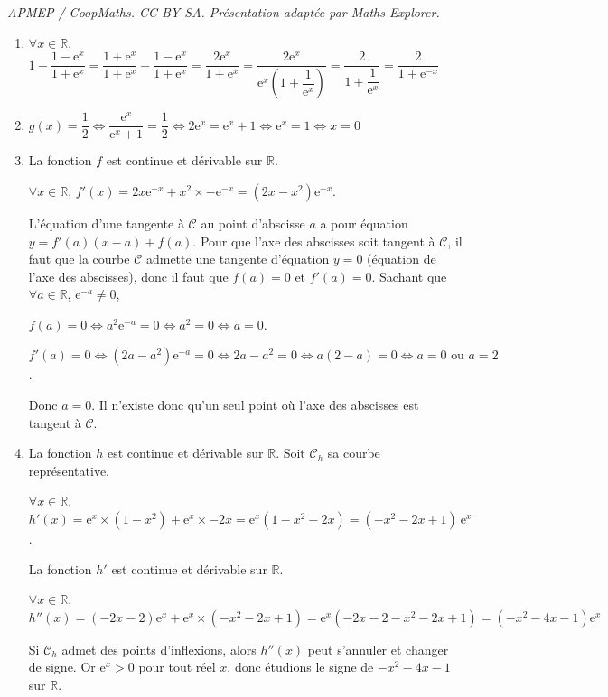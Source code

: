 \documentclass[10pt]{article}
\providecommand{\R}{\mathbb{R}}
\providecommand{\e}{{\mathrm{e}}}
\begin{document}
\noindent\textit{APMEP / CoopMaths. CC BY-SA. Présentation adaptée par Maths Explorer.}\par\medskip
\bigskip
\begin{enumerate}
	\item $\forall x \in \R$, $1-\dfrac{1-\e^x}{1+\e^{x}}=\dfrac{1+\e^x}{1+\e^x}-\dfrac{1-\e^x}{1+\e^x}=\dfrac{2\e^x}{1+\e^x}=\dfrac{2\e^x}{\e^x\left(1+\dfrac{1}{\e^x}\right)}=\dfrac{2}{1+\dfrac{1}{\e^x}}=\dfrac{2}{1+\e^{-x}}$

\hfill {}
\item $g(x)=\dfrac12 \iff \dfrac{\e^x}{\e^x+1}=\dfrac12 \iff 2\e^x=\e^x+1 \iff \e^x=1 \iff x=0$
\hfill {}
	\item La fonction $f$ est continue et dérivable sur $\R$.

	$\forall x \in \R$, $f'(x)=2x\e^{-x}+x^2\times -\e^{-x}= \left(2x-x^2\right)\e^{-x}$.

	L'équation d'une tangente à $\mathcal{C}$ au point d'abscisse $a$ a pour équation $ y=f'(a)(x-a)+f(a)$. Pour que l'axe des abscisses soit tangent à $\mathcal{C}$, il faut que la courbe $\mathcal{C}$ admette une tangente d'équation $y=0$ (équation de l'axe des abscisses), donc il faut que $f(a)=0$ et $f'(a)=0$. Sachant que $\forall a \in \R$, $\e^{-a}\neq 0$,

$f(a)=0 \iff a^2\e^{-a}=0 \iff a^2=0 \iff a=0$. 

$f'(a)=0\iff (2a-a^2)\e^{-a}=0 \iff 2a-a^2=0 \iff a(2-a)=0 \iff a=0 \text{ ou } a=2$.
	
Donc $a=0$. Il n'existe donc qu'un seul point où l'axe des abscisses est tangent à $\mathcal{C}$.

\hfill {}
	\item La fonction $h$ est continue et dérivable sur $\R$. Soit $\mathcal{C}_h$ sa courbe représentative.

$\forall x \in \R$, $h'(x)=\e^x\times \left(1-x^2\right)+\e^x\times-2x=\e^x\left(1-x^2-2x\right)= \left(-x^2-2x+1\right)~\e^x$.

La fonction $h'$ est continue et dérivable sur $\R$.

$\forall x \in \R$, $h''(x)=(-2x-2)\e^x+\e^x\times\left(-x^2-2x+1\right) =\e^x\left(-2x-2-x^2-2x+1\right)= \left(-x^2-4x-1\right)\e^x$

Si $\mathcal{C}_h$ admet des points d'inflexions, alors $h''(x)$ peut s'annuler et changer de signe. Or $\e^x > 0$ pour tout réel $x$, donc étudions le signe de $- x^2- 4x- 1$ sur $\R$.


\end{enumerate}
\end{document}
